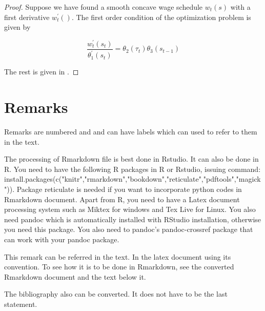 \documentclass[12pt,svgnames]{article}
\begin{document}
\begin{proof}
Suppose we have found a smooth concave wage schedule $w_{t}\left( s\right)$
with a first derivative $w_{t}^{\prime }\left( {}\right)$. The first order
condition of the optimization problem is given by 

\begin{equation}
\frac{w_{t}^{\prime }\left( s_{t}\right) }{\theta _{1}^{\prime }\left(
s_{t}\right) }=\theta _{2}\left( \tau _{t}\right) \theta _{3}\left(
s_{t-1}\right)  \label{eqq2}
\end{equation}

The rest is given in \cite{Raut_2017a}.

\end{proof}

\section{Remarks} \label{sec7}

Remarks are numbered and and can have labels which can used to refer to them in the text.


\begin{remark}
The processing of Rmarkdown file is best done in Rstudio. It can also be done in R. You need to have the following R packages in R or Rstudio, issuing command: install.packages(c("knitr","rmarkdown","bookdown","reticulate","pdftools","magick")). Package reticulate is needed if you want to incorporate python codes in Rmarkdown document. Apart from R, you need to have a Latex document processing system such as Miktex for windows and Tex Live for Linux.  You also need pandoc which is automatically installed with RStudio installation, otherwise you need this package. You also need to pandoc's pandoc-crossref package that can work with your pandoc package.  
\end{remark}


\begin{remark}
\label{re10}This remark can be referred in the text. In the latex document using its convention. To see how it is to be done in Rmarkdown, see the converted Rmarkdown document and the text below it.
\end{remark}


The bibliography also can be converted. It does not have to be the last statement. 

\printbibliography
\end{document}
